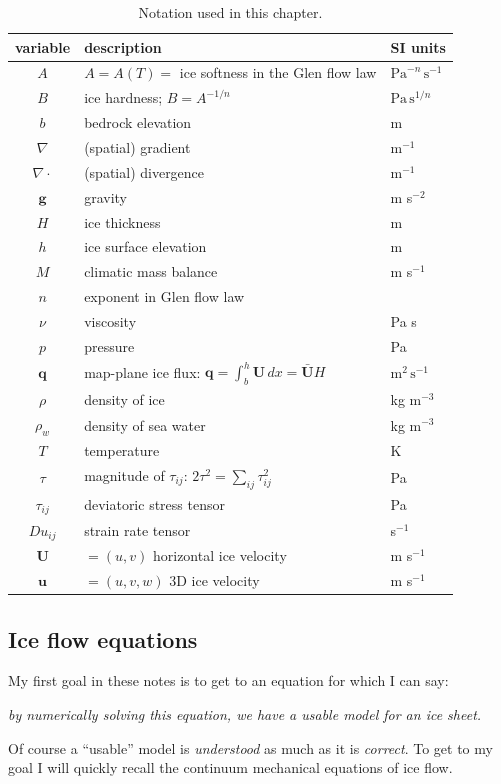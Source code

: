 \documentclass[titlepage,a4paper,final,12pt]{scrartcl}
\newcommand{\bq}{\mathbf{q}}
\newcommand{\bU}{\mathbf{U}}
\begin{document}
\begin{table}[ht]
\caption{Notation used in this chapter.}
\begin{tabular}{cll}
variable  & description & SI units \\ 
\hline
$A$ & $A=A(T)=$ ice softness in the Glen flow law & $\text{Pa}^{-n}\,\text{s}^{-1}$ \\
$B$ & ice hardness; $B=A^{-1/n}$ & $\text{Pa}\,\text{s}^{1/n}$ \\
$b$ & bedrock elevation & m \\
$\nabla$ & (spatial) gradient & m$^{-1}$ \\
$\nabla\cdot$ & (spatial) divergence & m$^{-1}$ \\
$\mathbf{g}$ & gravity & m s$^{-2}$ \\
$H$ & ice thickness & m \\
$h$ & ice surface elevation & m \\
$M$ & climatic mass balance & m s$^{-1}$ \\
$n$ & exponent in Glen flow law & \\
$\nu$ & viscosity & Pa s \\
$p$ & pressure & Pa \\
$\bq$ & map-plane ice flux: $\bq = \int_{b}^{h} \bU\,dx = \bar{\bU} H$ & $\text{m}^2\,\text{s}^{-1}$ \\
$\rho$ & density of ice & kg m$^{-3}$ \\
$\rho_w$ & density of sea water & kg m$^{-3}$ \\
$T$ & temperature & K \\
$\tau$ & magnitude of $\tau_{ij}$: $2 \tau^2 = \sum_{ij} \tau_{ij}^2$ & Pa \\
$\tau_{ij}$ & deviatoric stress tensor & Pa \\
$Du_{ij}$ & strain rate tensor & s$^{-1}$ \\
$\mathbf{U}$ & $=(u,v)$ horizontal ice velocity & m s$^{-1}$ \\
$\mathbf{u}$ & $=(u,v,w)$ 3D ice velocity & m s$^{-1}$ \\
\end{tabular}
\label{tab:notation}
\end{table}


\subsection{Ice flow equations}

My first goal in these notes is to get to an equation for which I can say:
\begin{center}
\emph{by numerically solving this equation, we have a usable model for an ice sheet.}
\end{center}
\noindent Of course a ``usable'' model is \emph{understood} as much as it is \emph{correct}.  To get to my goal I will quickly recall the continuum mechanical equations of ice flow.  
\end{document}
